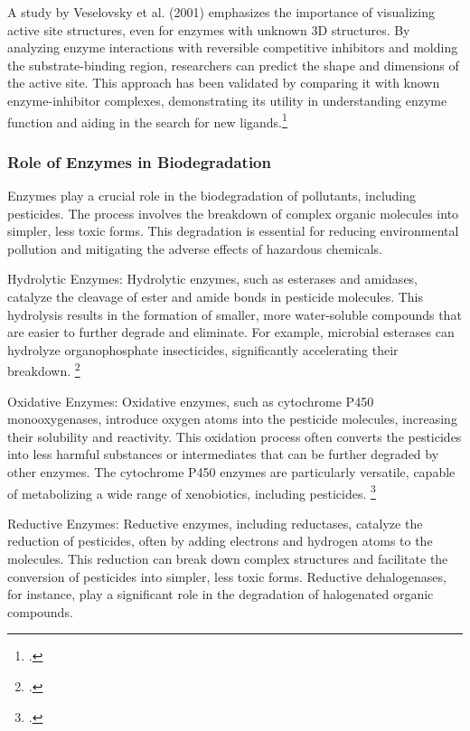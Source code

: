 A study by Veselovsky et al. (2001) emphasizes the importance of visualizing active site structures, even for enzymes with unknown 3D structures. By analyzing enzyme interactions with reversible competitive inhibitors and molding the substrate-binding region, researchers can predict the shape and dimensions of the active site. This approach has been validated by comparing it with known enzyme-inhibitor complexes, demonstrating its utility in understanding enzyme function and aiding in the search for new ligands.\footcite{veselovskyApproachVisualizationActive2001}

\subsubsection{Role of Enzymes in Biodegradation}
\label{sec:Role of Enzymes in Biodegradation}

Enzymes play a crucial role in the biodegradation of pollutants, including pesticides. The process involves the breakdown of complex organic molecules into simpler, less toxic forms. This degradation is essential for reducing environmental pollution and mitigating the adverse effects of hazardous chemicals.

Hydrolytic Enzymes: Hydrolytic enzymes, such as esterases and amidases, catalyze the cleavage of ester and amide bonds in pesticide molecules. This hydrolysis results in the formation of smaller, more water-soluble compounds that are easier to further degrade and eliminate. For example, microbial esterases can hydrolyze organophosphate insecticides, significantly accelerating their breakdown. \footcite{munneckeEnzymaticHydrolysisOrganophosphate1976a}

Oxidative Enzymes: Oxidative enzymes, such as cytochrome P450 monooxygenases, introduce oxygen atoms into the pesticide molecules, increasing their solubility and reactivity. This oxidation process often converts the pesticides into less harmful substances or intermediates that can be further degraded by other enzymes. The cytochrome P450 enzymes are particularly versatile, capable of metabolizing a wide range of xenobiotics, including pesticides. \footcite{belloTheoreticalApproachMechanism2000}

Reductive Enzymes: Reductive enzymes, including reductases, catalyze the reduction of pesticides, often by adding electrons and hydrogen atoms to the molecules. This reduction can break down complex structures and facilitate the conversion of pesticides into simpler, less toxic forms. Reductive dehalogenases, for instance, play a significant role in the degradation of halogenated organic compounds.

